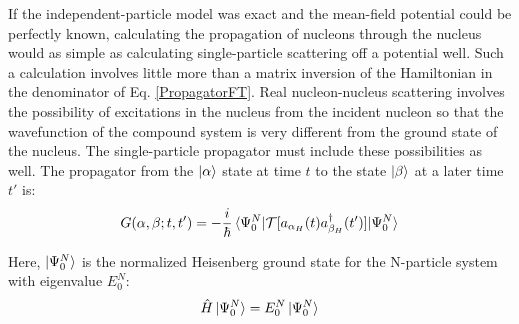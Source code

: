 \noindent
If the independent-particle model was exact and the mean-field potential could be perfectly known,
calculating the propagation of nucleons through the nucleus would as simple as calculating
single-particle scattering off a potential well. Such a calculation involves little more than
a matrix inversion of the Hamiltonian in the denominator of Eq. \ref{PropagatorFT}.
Real nucleon-nucleus scattering involves the possibility of excitations in the nucleus from the 
incident
nucleon so that the wavefunction of the compound system is very different from the ground state of
the nucleus. The single-particle propagator must include these possibilities as well.
The propagator from the $\ket{\alpha}$ state at time $t$ to the state $\ket{\beta}$ at a later time
$t'$ is:
\begin{equation} \label{ManyBodySPPropagator}
    G(\alpha, \beta; t, t') =
    -\frac{i}{\hbar}\braket{\Psi^{N}_{0}|\mathcal{T}
    [a_{\alpha_{H}}(t)a^{\dagger}_{\beta_{H}}(t')]|\Psi^{N}_{0}}
\end{equation}

\noindent
Here, $\ket{\Psi^{N}_{0}}$ is the normalized Heisenberg ground state for the N-particle system with
eigenvalue $E^{N}_{0}$:
\begin{equation} \label{NParticleGroundState}
    \hat{H}\ket{\Psi^{N}_{0}} = E^{N}_{0}\ket{\Psi^{N}_{0}}
\end{equation}

